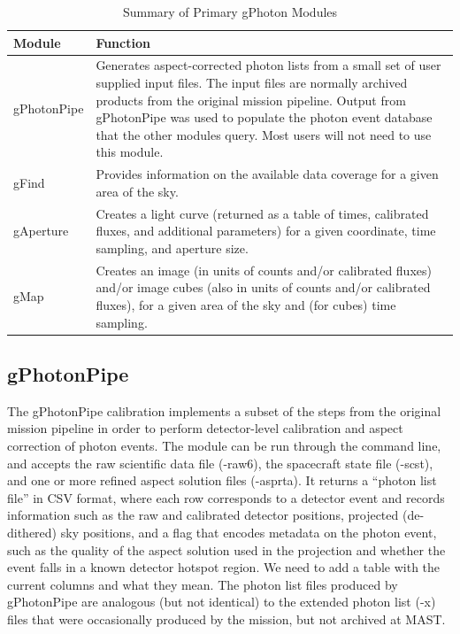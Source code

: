 \documentclass[5p]{elsarticle}
\begin{document}
\begin{table}
\begin{tabular}{|p{2cm}|p{6cm}|}
\hline
	{\bf Module} & {\bf Function}\\\hline
	gPhotonPipe & Generates aspect-corrected photon lists from a small set of user supplied input files.  The input files are normally archived products from the original mission pipeline. Output from gPhotonPipe was used to populate the photon event database that the other modules query.  Most users will not need to use this module.\\\hline
	gFind & Provides information on the available data coverage for a given area of the sky.\\\hline
	gAperture & Creates a light curve (returned as a table of times, calibrated fluxes, and additional parameters) for a given coordinate, time sampling, and aperture size.\\\hline
	gMap & Creates an image (in units of counts and/or calibrated fluxes) and/or image cubes (also in units of counts and/or calibrated fluxes), for a given area of the sky and (for cubes) time sampling.\\
\hline
\end{tabular}
\caption{Summary of Primary gPhoton Modules}
\label{moduledesc}
\end{table}

\subsection{gPhotonPipe}
The gPhotonPipe calibration implements a subset of the steps from the original mission pipeline in order to perform detector-level calibration and aspect correction of photon events. The module can be run through the command line, and accepts the raw scientific data file (-raw6), the spacecraft state file (-scst), and one or more refined aspect solution files (-asprta). It returns a ``photon list file'' in CSV format, where each row corresponds to a detector event and records information such as the raw and calibrated detector positions, projected (de-dithered) sky positions, and a flag that encodes metadata on the photon event, such as the quality of the aspect solution used in the projection and whether the event falls in a known detector hotspot region. {\color{red}We need to add a table with the current columns and what they mean.} The photon list files produced by gPhotonPipe are analogous (but not identical) to the extended photon list (-x) files that were occasionally produced by the mission, but not archived at MAST.
\end{document}
